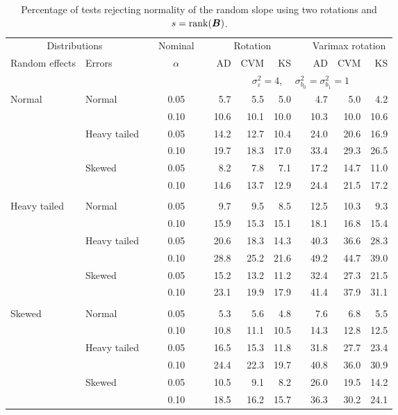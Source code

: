 


\begin{table}[ht]
\centering
\caption{\label{tab:fixedsimb1sB} Percentage of tests rejecting normality of the random slope using two rotations and $s = \operatorname{rank}(\bm{B})$.}
\begin{scriptsize}
\begin{tabular}{ll p{.1cm} c p{.1cm} rrr p{.1cm} rrr}
  \hline
  \multicolumn{2}{c}{Distributions}& & Nominal & &  \multicolumn{3}{c}{Rotation} & & \multicolumn{3}{c}{Varimax rotation} \\ \cline{1-2} \cline{6-8} \cline{10-12}   
  Random effects & Errors & & $\alpha$ & & AD & CVM & KS & & AD & CVM & KS \\ 
   \hline
& && && \multicolumn{7}{c}{$\sigma_{\varepsilon}^2 = 4$, \ \ $\sigma_{b_0}^2 = \sigma_{b_1}^2 = 1$} \\ \cline{6-12}
\rowcolor{gray!20} Normal & Normal &  & 0.05 &  & 5.7 & 5.5 & 5.0 &  & 4.7 & 5.0 & 4.2 \\ 
\rowcolor{gray!20}    &  &  & 0.10 &  & 10.6 & 10.1 & 10.0 &  & 10.3 & 10.0 & 10.6 \\ 
\rowcolor{gray!20}    & Heavy tailed &  & 0.05 &  & 14.2 & 12.7 & 10.4 &  & 24.0 & 20.6 & 16.9 \\ 
\rowcolor{gray!20}    &  &  & 0.10 &  & 19.7 & 18.3 & 17.0 &  & 33.4 & 29.3 & 26.5 \\ 
\rowcolor{gray!20}    & Skewed &  & 0.05 &  & 8.2 & 7.8 & 7.1 &  & 17.2 & 14.7 & 11.0 \\ 
\rowcolor{gray!20}    &  &  & 0.10 &  & 14.6 & 13.7 & 12.9 &  & 24.4 & 21.5 & 17.2 \\ 
&&&&&&&&&&&\\
  Heavy tailed & Normal &  & 0.05 &  & 9.7 & 9.5 & 8.5 &  & 12.5 & 10.3 & 9.3 \\ 
   &  &  & 0.10 &  & 15.9 & 15.3 & 15.1 &  & 18.1 & 16.8 & 15.4 \\ 
   & Heavy tailed &  & 0.05 &  & 20.6 & 18.3 & 14.3 &  & 40.3 & 36.6 & 28.3 \\ 
   &  &  & 0.10 &  & 28.8 & 25.2 & 21.6 &  & 49.2 & 44.7 & 39.0 \\ 
   & Skewed &  & 0.05 &  & 15.2 & 13.2 & 11.2 &  & 32.4 & 27.3 & 21.5 \\ 
   &  &  & 0.10 &  & 23.1 & 19.9 & 17.9 &  & 41.4 & 37.9 & 31.1 \\ 
&&&&&&&&&&&\\
  Skewed & Normal &  & 0.05 &  & 5.3 & 5.6 & 4.8 &  & 7.6 & 6.8 & 5.5 \\ 
   &  &  & 0.10 &  & 10.8 & 11.1 & 10.5 &  & 14.3 & 12.8 & 12.5 \\ 
   & Heavy tailed &  & 0.05 &  & 16.5 & 15.3 & 11.8 &  & 31.8 & 27.7 & 23.4 \\ 
   &  &  & 0.10 &  & 24.4 & 22.3 & 19.7 &  & 40.8 & 36.0 & 30.9 \\ 
   & Skewed &  & 0.05 &  & 10.5 & 9.1 & 8.2 &  & 26.0 & 19.5 & 14.2 \\ 
   &  &  & 0.10 &  & 18.5 & 16.2 & 15.7 &  & 36.3 & 30.2 & 24.1 \\ 


\end{tabular}
\end{scriptsize}
\end{table}
